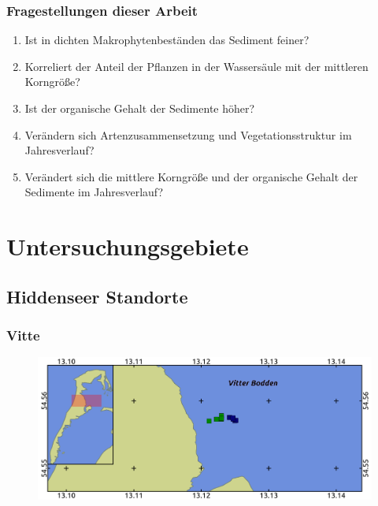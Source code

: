\documentclass{beamer}
\begin{document}
\begin{frame}
\frametitle{Fragestellungen dieser Arbeit}
\begin{enumerate}
\pause
\item Ist in dichten Makrophytenbeständen das Sediment feiner?
\pause
\item Korreliert der Anteil der Pflanzen in der Wassersäule mit der mittleren Korngröße?
\pause
\item Ist der organische Gehalt der Sedimente höher?
\pause
\item Verändern sich Artenzusammensetzung und Vegetationsstruktur im Jahresverlauf?
\pause
\item Verändert sich die mittlere Korngröße und der organische Gehalt der Sedimente im Jahresverlauf? 
\end{enumerate}
\end{frame}

\section{Untersuchungsgebiete}

\subsection{Hiddenseer Standorte}

\begin{frame}
\frametitle{Vitte}
\begin{figure}
\includegraphics[scale=0.24]{images/Vitte.png}
\end{figure}
\end{frame}
\end{document}
